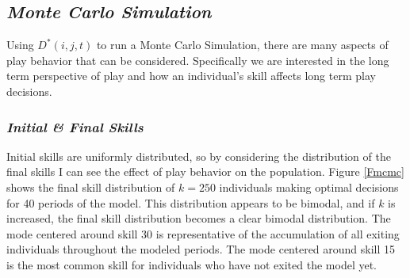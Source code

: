 \documentclass[12pt, letterpaper, fleqn]{article}
\begin{document}
      
  \subsection*{\it Monte Carlo Simulation}
    Using $D^*(i,j,t)$ to run a Monte Carlo Simulation, there are many aspects of play behavior that can be considered.
    Specifically we are interested in the long term perspective of play and how an individual's skill affects long term play decisions.      
    \subsubsection*{\it Initial \& Final Skills}
      Initial skills are uniformly distributed, so by considering the distribution of the final skills I can see the effect of play behavior on the population.
      Figure \ref{Fmcmc} shows the final skill distribution of $k=250$ individuals making optimal decisions for 40 periods of the model.
      This distribution appears to be bimodal, and if $k$ is increased, the final skill distribution becomes a clear bimodal distribution.
      The mode centered around skill 30 is representative of the accumulation of all exiting individuals throughout the modeled periods. 
      The mode centered around skill 15 is the most common skill for individuals who have not exited the model yet.
      
\end{document}
